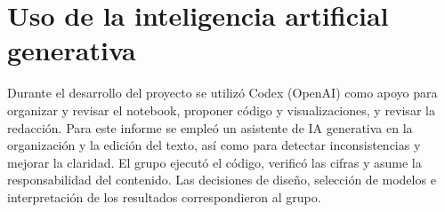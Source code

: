 \section{Uso de la inteligencia artificial generativa}\label{sec:ai}

Durante el desarrollo del proyecto se utilizó Codex (OpenAI) como apoyo para organizar y revisar el notebook, proponer código y visualizaciones, y revisar la redacción. Para este informe se empleó un asistente de IA generativa en la organización y la edición del texto, así como para detectar inconsistencias y mejorar la claridad. El grupo ejecutó el código, verificó las cifras y asume la responsabilidad del contenido. Las decisiones de diseño, selección de modelos e interpretación de los resultados correspondieron al grupo.
